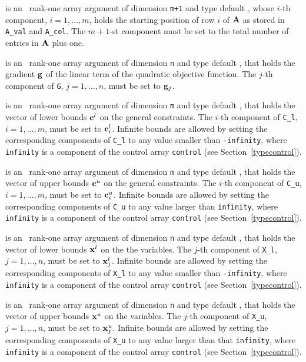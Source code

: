 \documentclass{galahad}
\begin{document}
\begin{description}
 is an \intentin\ rank-one array argument
of dimension {\tt m+1} and type default \integer,
whose $i$-th component, $i = 1, \ldots , m$, holds the  starting position
of row $i$ of ${\mathbf{A}}$ as stored in {\tt A\_val} and {\tt A\_col}.
The $m+1$-st component must be set to the total number of entries
in ${\mathbf{A}}$ plus one.

 is an \intentin\ rank-one array argument of dimension {\tt n}
and type default \realdp, that holds the gradient ${\mathbf{g}}$
of the linear term of the quadratic objective function.
The $j$-th component of {\tt G}, $j = 1,  \ldots ,  n$, must be set to
${\mathbf{g}}_{j}$.

 is an \intentin\ rank-one array argument of dimension {\tt m}
and type default \realdp, that holds the vector of lower bounds ${\mathbf{c}}^{l}$
on the general constraints. The $i$-th component of
{\tt C\_l}, $i = 1, \ldots , m$, must be set to ${\mathbf{c}}_{i}^{l}$.
Infinite bounds are allowed by setting the corresponding
components of {\tt C\_l} to any value smaller than {\tt -infinity},
where {\tt infinity} is a component of the control array {\tt control}
(see Section~\ref{typecontrol}).

 is an \intentin\ rank-one array argument of dimension {\tt m}
and type default \realdp, that holds the vector of upper bounds ${\mathbf{c}}^{u}$
on the general constraints. The $i$-th component of
{\tt C\_u}, $i = 1,  \ldots ,  m$, must be set to ${\mathbf{c}}_{i}^{u}$.
Infinite bounds are allowed by setting the corresponding
components of {\tt C\_u} to any value larger than {\tt infinity},
where {\tt infinity} is a component of the control array {\tt control}
(see Section~\ref{typecontrol}).

 is an \intentin\ rank-one array argument of dimension {\tt n}
and type default \realdp, that holds
the vector of lower bounds ${\mathbf{x}}^{l}$ on the the variables.
The $j$-th component of {\tt X\_l}, $j = 1, \ldots , n$,
must be set to ${\mathbf{x}}_{j}^{l}$.
Infinite bounds are allowed by setting the corresponding
components of {\tt X\_l} to any value smaller than {\tt -infinity},
where {\tt infinity} is a component of the control array {\tt control}
(see Section~\ref{typecontrol}).

 is an \intentin\  rank-one array argument of dimension {\tt n}
and type default \realdp, that holds
the vector of upper bounds ${\mathbf{x}}^{u}$ on the variables.
The $j$-th component of {\tt X\_u}, $j = 1, \ldots , n$,
must be set to ${\mathbf{x}}_{j}^{u}$.
Infinite bounds are allowed by setting the corresponding
components of {\tt X\_u} to any value larger than that {\tt infinity},
where {\tt infinity} is a component of the control array {\tt control}
(see Section~\ref{typecontrol}).


\end{description}
\end{document}
